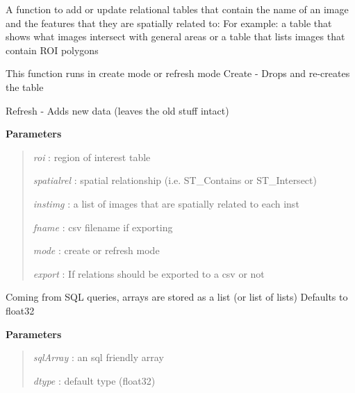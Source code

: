 \documentclass[letterpaper,10pt,openany,oneside]{sphinxmanual}
\begin{document}
\begin{fulllineitems}
\begin{fulllineitems}
\end{fulllineitems}


\begin{fulllineitems}
\label{code:Database.Database.relations2db}
A function to add or update relational tables that contain the name of an image
and the features that they are spatially related to:
For example:  a table that shows what images intersect with general areas or
a table that lists images that contain ROI polygons

This function runs in create mode or refresh mode
Create - Drops and re-creates the table

Refresh - Adds new data (leaves the old stuff intact)

\textbf{Parameters}
\begin{quote}

\emph{roi}        : region of interest table

\emph{spatialrel} : spatial relationship (i.e. ST\_Contains or ST\_Intersect)

\emph{instimg}    : a list of images that are spatially related to each inst

\emph{fname}      : csv filename if exporting

\emph{mode}       : create or refresh mode

\emph{export}     : If relations should be exported to a csv or not
\end{quote}

\end{fulllineitems}


\begin{fulllineitems}
\label{code:Database.Database.sql2numpy}
Coming from SQL queries, arrays are stored as a list (or list of lists)
Defaults to float32

\textbf{Parameters}
\begin{quote}

\emph{sqlArray} : an sql friendly array

\emph{dtype}    : default type (float32)
\end{quote}


\end{fulllineitems}
\end{fulllineitems}
\end{document}
